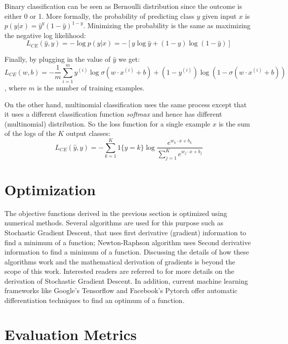 Binary classification can be seen as Bernoulli distribution since the outcome is either 0 or 1. More formally, the probability of predicting class $y$ given input $x$ is  $p ( y | x ) = \hat { y } ^ { y } ( 1 - \hat { y } ) ^ { 1 - y }$. Minimizing the probability is the same as maximizing the negative log likelihood:
 $$L _ { C E } ( \hat { y } , y ) = - \log p ( y | x ) = - [ y \log \hat { y } + ( 1 - y ) \log ( 1 - \hat { y } ) ]$$

Finally, by plugging in the value of $\hat{y}$ we get:
$$ L _ { C E } ( w , b ) = - \frac { 1 } { m } \sum _ { i = 1 } ^ { m } y ^ { ( i ) } \log \sigma \left( w \cdot x ^ { ( i ) } + b \right) + \left( 1 - y ^ { ( i ) } \right) \log \left( 1 - \sigma \left( w \cdot x ^ { ( i ) } + b \right) \right) $$, where $m$ is the number of training examples.

On the other hand, multinomial classification uses the same process except that it uses a different classification function \emph{softmax} and hence has different (multinomial) distribution. So the loss function for a single example $x$ is the sum of the logs of the $K$ output classes:
$$ L _ { C E } ( \hat { y } , y ) = - \sum _ { k = 1 } ^ { K } 1 \{ y = k \} \log \frac { e ^ { w _ { k } \cdot x + b _ { k } } } { \sum _ { j = 1 } ^ { K } e ^ { w _ { j } \cdot x + b _ { j } } } $$

\section{Optimization}

The objective functions derived in the previous section is optimized  using numerical methods. Several algorithms are used for this purpose such as Stochastic Gradient Descent, that uses first derivative (gradient) information to find a minimum of a function; Newton-Raphson algorithm uses Second derivative information to find a minimum of a function. Discussing the details of how these algorithms work and the mathematical derivation of gradients is beyond the scope of this work. Interested readers are referred to \citep{jurafsky2014speech} for more details on the derivation of Stochastic Gradient Descent. In addition, current machine learning frameworks like Google's Tensorflow and Facebook's Pytorch offer automatic differentiation techniques to find an optimum of a function. 

\section{Evaluation Metrics}
